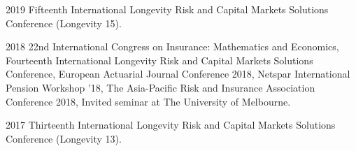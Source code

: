 \documentclass[12pt,letterpaper]{report}
\begin{document}
%
%
%
%
%
%
%
%


    \begin{tablist}
		\item[2019] \tab Fifteenth International Longevity Risk and Capital Markets Solutions Conference (Longevity 15).
		
        \item[2018] \tab 22nd International Congress on Insurance: Mathematics and Economics, Fourteenth International Longevity Risk and Capital Markets Solutions Conference, European Actuarial Journal Conference 2018, Netspar International Pension Workshop ’18, The Asia-Pacific Risk and Insurance Association Conference 2018, Invited seminar at The University of Melbourne.
        
        \item[2017] \tab Thirteenth International Longevity Risk and Capital Markets Solutions Conference (Longevity 13).
        
%        

    \end{tablist}
\end{document}
